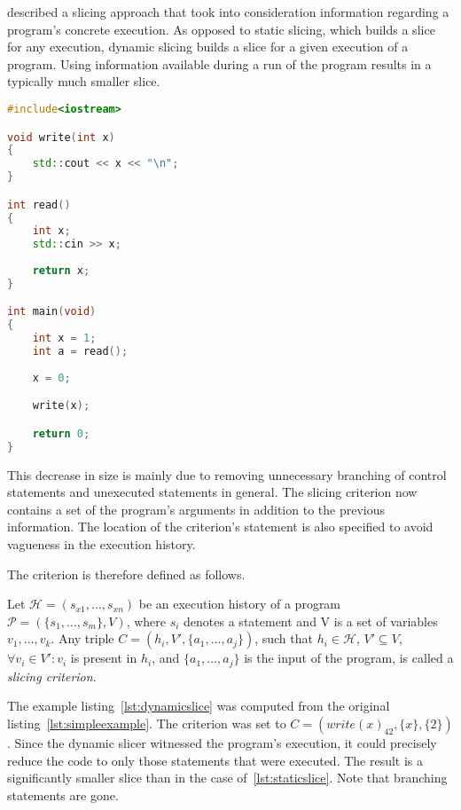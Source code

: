 \citet{Korel88} described a slicing approach that took into 
consideration information regarding a program's concrete execution. 
As opposed to static slicing, which builds a slice for any execution, 
dynamic slicing builds a slice for a given execution of a program. 
Using information available during a run of the program 
results in a typically much smaller slice.

\begin{lstlisting}[caption=Dynamic slice of the simple
  branching program, language=C++, label={lst:dynamicslice}]
#include<iostream>

void write(int x)
{
	std::cout << x << "\n";
}

int read()
{
	int x;
	std::cin >> x;
	
	return x;
}

int main(void)
{
	int x = 1;
	int a = read();
		
	x = 0;

	write(x);

	return 0;
}  
\end{lstlisting}

This decrease in size is mainly due to removing unnecessary 
branching of control statements and unexecuted statements in general. 
The slicing criterion now contains a set of the program's 
arguments in addition to the previous information. 
The location of the criterion's statement is also specified to avoid 
vagueness in the execution history. 

The criterion is therefore defined as follows.

\begin{defn}\label{def02:6}
  Let $\mathcal{H} = (s_{x1},\dots,s_{xn})$ be an execution history of a program 
  $\mathcal{P} = (\{s_1,\dots,s_m\}, V)$, where $s_i$ denotes a statement
  and V is a set of variables $v_1,\dots,v_k$.
  Any triple $C = (h_i, V', \{a_1,\dots,a_j\})$, such that $h_i \in \mathcal{H}$,
  $V' \subseteq V$, $\forall v_i \in V': v_i$ is present in $h_i$,
  and $\{a_1,\dots,a_j\}$ is the input of the program,
  is called a \emph{slicing criterion}.
\end{defn}

The example listing~\ref{lst:dynamicslice} was computed from the original
listing~\ref{lst:simpleexample}. 
The criterion was set to $C = (write(x)_{42}, \{x\}, \{2\})$.
Since the dynamic slicer witnessed the program's execution,
it could precisely reduce the code to only those statements
that were executed. The result is a significantly smaller slice
than in the case of~\ref{lst:staticslice}.
Note that branching statements are gone.

